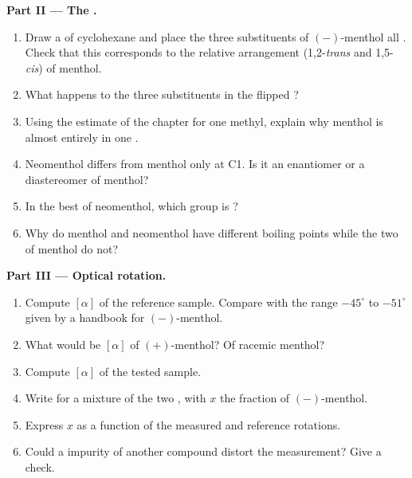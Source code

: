 \begin{problem}
\medskip
\noindent\textbf{Part II --- The .}
\begin{enumerate}[resume]
  \item Draw a  of cyclohexane and place the three substituents of
        $(-)$-menthol all . Check that this corresponds to the
        relative arrangement (1,2-\textit{trans} and 1,5-\textit{cis})
        of menthol.
  \item What happens to the three substituents in the flipped ?
  \item Using the estimate of the chapter for one  methyl, explain
        why menthol is almost entirely in one .
  \item Neomenthol differs from menthol only at C1. Is it an enantiomer or
        a diastereomer of menthol?
  \item In the best  of neomenthol, which group is ?
  \item Why do menthol and neomenthol have different boiling points
        while the two  of menthol do not?
\end{enumerate}

\medskip
\noindent\textbf{Part III --- Optical rotation.}
\begin{enumerate}[resume]
  \item Compute $[\alpha]$ of the reference sample. Compare with the range
        $-45^\circ$ to $-51^\circ$ given by a handbook for $(-)$-menthol.
  \item What would be $[\alpha]$ of $(+)$-menthol? Of racemic menthol?
  \item Compute $[\alpha]$ of the tested sample.
  \item Write  for a mixture of the two , with $x$
        the fraction of $(-)$-menthol.
  \item Express $x$ as a function of the measured and reference
        rotations.
  \item Could a  impurity of another compound distort the
        measurement? Give a check.
\end{enumerate}


\end{problem}
